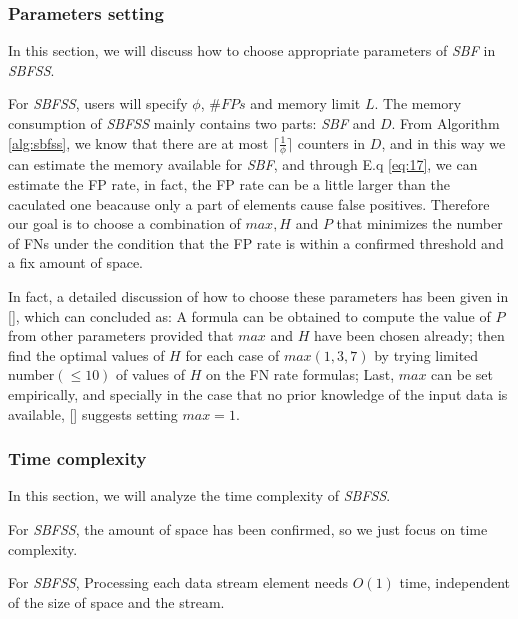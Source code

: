 \documentclass[conference]{IEEEtran}
\begin{document}
\subsubsection{\textbf{Parameters setting}}
In this section, we will discuss how to choose appropriate parameters of \emph{SBF} in \emph{SBFSS}.\par 
For \emph{SBFSS}, users will specify $\phi$, $\#FPs$ and memory limit $L$. The memory consumption of \emph{SBFSS} mainly contains two parts: \emph{SBF} and $D$. From Algorithm \ref{alg:sbfss}, we know that there are at most $\lceil\frac{1}{\phi}\rceil$ counters in $D$, and in this way we can estimate the memory available for \emph{SBF}, and through E.q \ref{eq:17}, we can estimate the FP rate, in fact, the FP rate can be a little larger than the caculated one beacause only a part of elements cause false positives. Therefore our goal is to choose a combination of $max,H$ and $P$ that minimizes the number of FNs under the condition that the FP rate is within a confirmed threshold and a fix amount of space.\par
In fact, a detailed discussion of how to choose these parameters has been given in [], which can concluded as: A formula can be obtained to compute the value of $P$ from other parameters provided that $max$ and $H$ have been chosen already; then ﬁnd the optimal values of $H$ for each case of $max(1,3,7)$ by trying limited number$(\leq 10)$ of values of $H$ on the FN rate formulas; Last, $max$ can be set empirically, and specially in the case that no prior knowledge of the input data is available, [] suggests setting $max=1$.

\subsubsection{\textbf{Time complexity}}
In this section, we will analyze the time complexity of \emph{SBFSS}.\par
For \emph{SBFSS}, the amount of space has been confirmed, so we just focus on time complexity.

\begin{theorem}\label{thm:8}
For \emph{SBFSS}, Processing each data stream element needs $O(1)$ time, independent of the size of space and the stream.
\end{theorem}
\end{document}
